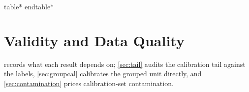 \documentclass[conference]{IEEEtran}
\begin{document}










\begingroup
\setlength{\columnwidth}{\textwidth}
\expandafter\let\expandafter\table\csname table*\endcsname
\expandafter\let\expandafter\endtable\csname endtable*\endcsname

\endgroup

\section{Validity and Data Quality}\label{app:validity}\label{app:quality}

 records what each result depends on; \cref{sec:tail} audits the calibration tail
against the labels, \cref{sec:groupcal} calibrates the grouped unit directly, and
\cref{sec:contamination} prices calibration-set contamination.
\end{document}
